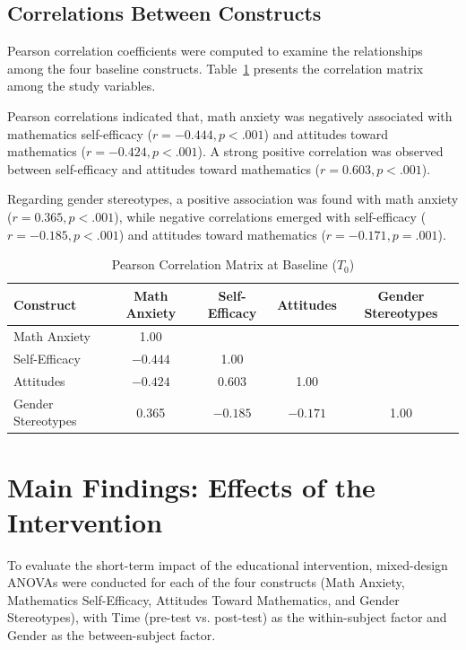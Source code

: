 \subsection{Correlations Between Constructs}

Pearson correlation coefficients were computed to examine the relationships among the four baseline constructs. Table~\ref{tab:corr_baseline} presents the correlation matrix among the study variables.

Pearson correlations indicated that, math anxiety was negatively associated with mathematics self-efficacy ($r = -0.444, p < .001$) and attitudes toward mathematics ($r = -0.424, p < .001$). A strong positive correlation was observed between self-efficacy and attitudes toward mathematics ($r = 0.603, p < .001$).

Regarding gender stereotypes, a positive association was found with math anxiety ($r = 0.365, p < .001$), while negative correlations emerged with self-efficacy ($r = -0.185, p < .001$) and attitudes toward mathematics ($r = -0.171, p = .001$).

\begin{table}[H]
\centering
\caption{Pearson Correlation Matrix at Baseline ($T_0$)}
\label{tab:corr_baseline}
\vspace{0.3cm}
\renewcommand{\arraystretch}{1.2}

\begin{tabular}{lcccc}
\toprule
Construct & Math Anxiety & Self-Efficacy & Attitudes & Gender Stereotypes \\
\midrule

Math Anxiety & 1.00 & & & \\

Self-Efficacy 
& $-0.444$ 
& 1.00 
& 
& \\

Attitudes 
& $-0.424$
& 0.603 
& 1.00 
& \\

Gender Stereotypes 
& 0.365
& $-0.185$
& $-0.171$
& 1.00 \\

\bottomrule
\end{tabular}
\end{table}


\section{Main Findings: Effects of the Intervention}

To evaluate the short-term impact of the educational intervention, mixed-design ANOVAs were conducted for each of the four constructs (Math Anxiety, Mathematics Self-Efficacy, Attitudes Toward Mathematics, and Gender Stereotypes), with Time (pre-test vs. post-test) as the within-subject factor and Gender as the between-subject factor.

